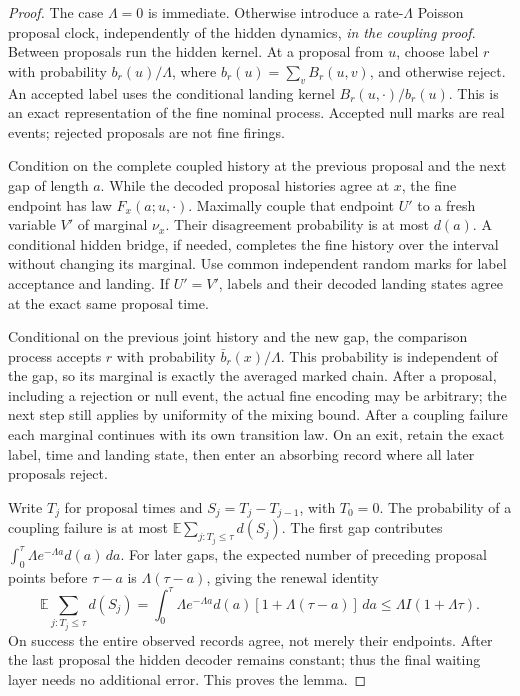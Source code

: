 \documentclass[11pt,reqno]{amsart}
\theoremstyle{definition}
\theoremstyle{remark}
\newcommand{\E}{\mathbb E}
\begin{document}
\begin{proof}
The case $\Lambda=0$ is immediate. Otherwise introduce a rate-$\Lambda$
Poisson proposal clock, independently of the hidden
dynamics, \emph{in the coupling proof}. Between proposals run the hidden
kernel. At a proposal from $u$, choose label $r$ with probability
$b_r(u)/\Lambda$, where $b_r(u)=\sum_vB_r(u,v)$, and otherwise reject. An
accepted label uses the conditional landing kernel $B_r(u,\cdot)/b_r(u)$.
This is an exact representation of the fine nominal process. Accepted null
marks are real events; rejected proposals are not fine firings.

Condition on the complete coupled history at the previous proposal and the
next gap of length $a$. While the decoded proposal histories agree at $x$,
the fine endpoint has law $F_x(a;u,\cdot)$. Maximally couple that endpoint
$U'$ to a fresh variable $V'$ of marginal $\nu_x$. Their disagreement
probability is at most $d(a)$. A conditional hidden bridge, if needed,
completes the fine history over the interval without changing its marginal.
Use common independent random marks for label acceptance and landing.
If $U'=V'$, labels and their decoded landing states agree at the exact same
proposal time.

Conditional on the previous joint history and the new gap, the comparison
process accepts $r$ with probability $\bar b_r(x)/\Lambda$. This probability
is independent of the gap, so its marginal is exactly the averaged marked
chain. After a proposal, including a rejection or null event, the actual
fine encoding may be arbitrary; the next step still applies by uniformity
of the mixing bound. After a coupling failure each marginal continues with its own transition
law. On an exit, retain the exact label, time and landing
state, then enter an absorbing record where all later proposals reject.

Write $T_j$ for proposal times and $S_j=T_j-T_{j-1}$, with $T_0=0$.
The probability of a coupling failure is at most
$\E\sum_{j:T_j\le\tau}d(S_j)$. The first gap contributes
$\int_0^\tau\Lambda e^{-\Lambda a}d(a)\,da$.
For later gaps, the expected number of preceding proposal points before
$\tau-a$ is $\Lambda(\tau-a)$, giving the renewal identity
\begin{equation}\label{eq:renewal}
 \E\sum_{j:T_j\le\tau}d(S_j)
 =\int_0^\tau\Lambda e^{-\Lambda a}d(a)
       [1+\Lambda(\tau-a)]\,da
 \le\Lambda I(1+\Lambda\tau).
\end{equation}
On success the entire observed records agree, not merely their endpoints.
After the last proposal the hidden decoder remains constant; thus the final
waiting layer needs no additional error. This proves the lemma.
\end{proof}
\end{document}

